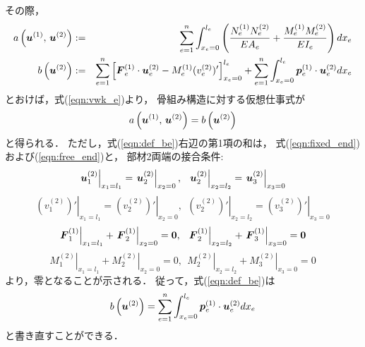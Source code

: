 \documentclass[10pt,a4j]{jarticle}
\begin{document}
その際，
\begin{eqnarray}
	a\left(
		\fat{u}^{(1)}
		,\,  
		\fat{u}^{(2)}
	\right) 
	&:=& 
	\sum_{e=1}^n 
	\int_{x_e=0}^{l_e} 
	\left(
	\frac{N_e^{(1)}N_e^{(2)}}{EA_e}
	+
	\frac{M_e^{(1)}M_e^{(2)}}{EI_e}
	\right)
	dx_e
	\label{eqn:def_ae}
	\\
%
	b\left( 
		 \fat{u}^{(2)}
	\right)
	&:=&
	\sum_{e=1}^n
	\left[ 
		\fat{F}_e^{(1)}\cdot \fat{u}_e^{(2)}
		-
		M_e^{(1)}
		(v_e^{(2)})'
	\right]_{x_e=0}^{l_e}
	+
	\sum_{e=1}^n 
	\int_{x_e=0}^{l_e} 
	\fat{p}_e^{(1)} \cdot \fat{u}_e^{(2)}dx_e
	\label{eqn:def_be}
\end{eqnarray}
とおけば，式(\ref{eqn:vwk_e})より，
骨組み構造に対する仮想仕事式が
\begin{equation}
	a\left(
		 \mbox{\boldmath $u$}^{(1)}
		,\,  
		\mbox{\boldmath $u$}^{(2)}
	\right) 
	=
	b\left( 
		\mbox{\boldmath $u$}^{(2)}
	\right)
	\label{eqn:VW_frame}
\end{equation}
と得られる．
ただし，式(\ref{eqn:def_be})右辺の第1項の和は，
式(\ref{eqn:fixed_end})および(\ref{eqn:free_end})と，
部材2両端の接合条件:
\begin{equation}
	\left. \fat{u}_1^{(2)} \right|_{x_1=l_1}
	=
	\left. \fat{u}_2^{(2)} \right|_{x_2=0}, \ \ 
	\left. \fat{u}_2^{(2)} \right|_{x_2=l_2}
	=
	\left. \fat{u}_3^{(2)} \right|_{x_3=0}
	\label{eqn:}
\end{equation}
\begin{equation}
	\left. (v_1^{(2)})' \right|_{x_1=l_1}
	=
	\left. (v_2^{(2)})' \right|_{x_2=0}, \ \ 
	\left. (v_2^{(2)})' \right|_{x_2=l_2}
	=
	\left. (v_3^{(2)})' \right|_{x_3=0}
	\label{eqn:}
\end{equation}
\begin{equation}
	\left. \fat{F}_1^{(1)} \right|_{x_1=l_1}
	+
	\left. \fat{F}_2^{(1)} \right|_{x_2=0}
	=\fat{0}	
	, \ \ 
	\left. \fat{F}_2^{(1)} \right|_{x_2=l_2}
	+
	\left. \fat{F}_3^{(1)} \right|_{x_3=0}
	=\fat{0}	
	\label{eqn:}
\end{equation}
\begin{equation}
	\left. M_1^{(2)} \right|_{x_1=l_1}
	+
	\left. M_2^{(2)} \right|_{x_2=0}=0
	, \ \ 
	\left. M_2^{(2)} \right|_{x_2=l_2}
	+
	\left. M_3^{(2)} \right|_{x_3=0}=0
	\label{eqn:}
\end{equation}
より，零となることが示される．
従って，式(\ref{eqn:def_be})は
\begin{equation}
	b\left( 
		 \mbox{\boldmath $u$}^{(2)}
	\right)
	=
	\sum_{e=1}^n 
	\int_{x_e=0}^{l_e} 
	\mbox{\boldmath $p$}_e^{(1)} \cdot \mbox{\boldmath $u$}_e^{(2)}dx_e
	\label{eqn:def_be2}
\end{equation}
と書き直すことができる．
\end{document}
